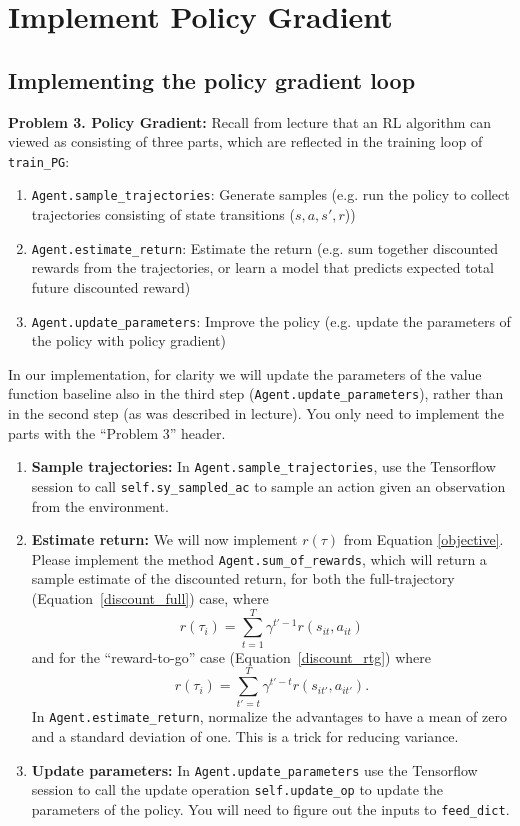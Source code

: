 \documentclass[12pt]{article}
\begin{document}
\section{Implement Policy Gradient}
\subsection{Implementing the policy gradient loop}
\textbf{Problem 3. Policy Gradient:} Recall from lecture that an RL algorithm can viewed as consisting of three parts, which are reflected in the training loop of \verb|train_PG|:
\begin{enumerate}
    \item \verb|Agent.sample_trajectories|: Generate samples (e.g. run the policy to collect trajectories consisting of state transitions ($s, a, s', r$))
    \item \verb|Agent.estimate_return|: Estimate the return (e.g. sum together discounted rewards from the trajectories, or learn a model that predicts expected total future discounted reward)
    \item \verb|Agent.update_parameters|: Improve the policy (e.g. update the parameters of the policy with policy gradient)
\end{enumerate}
In our implementation, for clarity we will update the parameters of the value function baseline also in the third step (\verb|Agent.update_parameters|), rather than in the second step (as was described in lecture). You only need to implement the parts with the ``Problem 3'' header. 
\begin{enumerate} [label=(\alph*)]
    \item \textbf{Sample trajectories:} In \texttt{Agent.sample\_trajectories}, use the Tensorflow session to call \texttt{self.sy\_sampled\_ac} to sample an action given an observation from the environment.
    \item \textbf{Estimate return:} We will now implement $r(\tau)$ from Equation \ref{objective}. 
    Please implement the method \verb|Agent.sum_of_rewards|, which will return a sample estimate of the discounted return, 
    for both the full-trajectory (Equation~\ref{discount_full}) case, where $$r(\tau_i) = \sum_{t=1}^T \gamma^{t'-1} r(s_{it}, a_{it})$$ and 
    for the ``reward-to-go'' case (Equation~\ref{discount_rtg}) where $$r(\tau_i) = \sum_{t'=t}^T \gamma^{t'-t} r(s_{it'}, a_{it'}).$$
    In \verb|Agent.estimate_return|, normalize the advantages to have a mean of zero and a standard deviation of one. This is a trick for reducing variance.
    \item \textbf{Update parameters:} In \verb|Agent.update_parameters| use the Tensorflow session to call the update operation \texttt{self.update\_op} to update the parameters of the policy. You will need to figure out the inputs to \texttt{feed\_dict}.
\end{enumerate}
\end{document}
